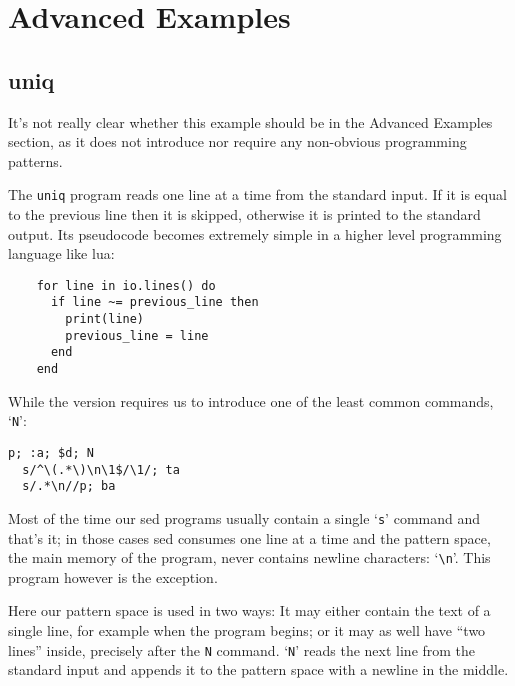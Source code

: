 \section{Advanced Examples}

\subsection{uniq}

It's not really clear whether this example should be in the Advanced Examples
section, as it does not introduce nor require any non-obvious programming
patterns.

The {\tt uniq} program reads one line at a time from the standard input.
If it is equal to the previous line then it is skipped, otherwise it is printed
to the standard output.  Its pseudocode becomes extremely simple in a higher
level programming language like lua:

	\begin{Verbatim}
	for line in io.lines() do
	  if line ~= previous_line then
	    print(line)
	    previous_line = line
	  end
	end
	\end{Verbatim}

While the \sed* version requires us to introduce one of the least common
commands, `{\tt N}':

\begin{Verbatim}
p; :a; $d; N
  s/^\(.*\)\n\1$/\1/; ta
  s/.*\n//p; ba
\end{Verbatim}

Most of the time our sed programs usually contain a single `{\tt s}' command
and that's it; in those cases sed consumes one line at a time and the pattern
space, the main memory of the program, never contains newline characters:
`\verb|\n|'.  This program however is the exception.

Here our pattern space is used in two ways: It may either contain the text of a
single line, for example when the program begins; or it may as well have ``two
lines'' inside, precisely after the {\tt N} command.
`{\tt N}' reads the next line from the standard input and appends it to the
pattern space with a newline in the middle.

